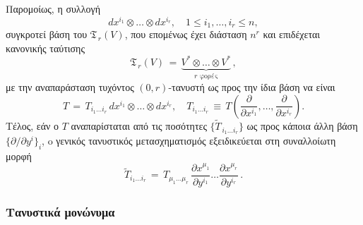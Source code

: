 \documentclass[11pt,a4paper,twoside,openright]{book}
\begin{document}
Παρομοίως, η συλλογή
\begin{equation}\label{eq:covariant-tensor-space-base}
dx^{i_1} \otimes \dots \otimes dx^{i_r},
\quad
1 \le i_1, \dots, i_r \le n,
\end{equation}
συγκροτεί βάση του $\mathfrak{T}_{\,r}(V)$,
που επομένως έχει διάσταση $n^r$ και επιδέχεται κανονικής ταύτισης 
\begin{equation}\label{eq:covariant-space-canonical-isomorphism}
\mathfrak{T}_{\,r}(V)
\,=\,
\underbrace{V^* \otimes \dots \otimes V^*}_{r \text{ φορές}}\,,
\end{equation}
με την αναπαράσταση τυχόντος $(0,r)$-τανυστή ως προς την ίδια βάση να είναι
\begin{equation}\label{eq:covariant-tensor-representation}
Τ
\,=\,
T_{i_1 \dots i_r} \, dx^{i_1} \otimes \dots \otimes dx^{i_r},
\quad
T_{i_1 \dots i_r}
\,\equiv\,
T\left(\frac{\partial}{\partial x^{i_1}}, \dots, \frac{\partial}{\partial x^{i_r}}\right).
\end{equation}
Τέλος, εάν ο $Τ$ αναπαρίσταται από τις ποσότητες
$\{\widetilde{T}_{\,i_1 \dots i_r}\}$ ως προς κάποια άλλη
βάση $\{\partial/\partial y^i\}_i$,
o γενικός τανυστικός μετασχηματισμός εξειδικεύεται στη συναλλοίωτη μορφή
\begin{equation}\label{eq:covariant-tensor-transfor}
\widetilde{T}_{i_1 \dots i_r}
\,=\,
T_{\mu_1 \dots \mu_r}\,
\frac{\partial x^{\mu_1}}{\partial y^{i_1}} \dots \frac{\partial x^{\mu_r}}{\partial y^{i_r}}\,.
\end{equation}

\subsubsection{Τανυστικά μονώνυμα}
	\label{sec:tensor-mononyms}
	
\end{document}
